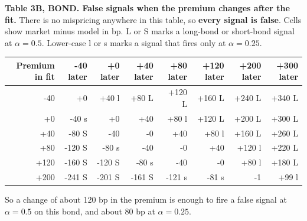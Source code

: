 \documentclass[10pt,a4paper]{article}
\begin{document}
\textbf{Table 3B, BOND. False signals when the premium changes after the fit.} There is no mispricing anywhere in this table, so \textbf{every signal is false}. Cells show market minus model in bp. L or S marks a long-bond or short-bond signal at $\alpha=0.5$. Lower-case l or s marks a signal that fires only at $\alpha=0.25$.
{\small
\begin{center}\begin{tabular}{rrrrrrrr}\toprule
Premium in fit & -40 later & +0 later & +40 later & +80 later & +120 later & +200 later & +300 later \\ \midrule
-40 & +0 & +40 l & +80 L & +120 L & +160 L & +240 L & +340 L \\
+0 & -40 s & +0 & +40 & +80 l & +120 L & +200 L & +300 L \\
+40 & -80 S & -40 & -0 & +40 & +80 l & +160 L & +260 L \\
+80 & -120 S & -80 s & -40 & -0 & +40 & +120 l & +220 L \\
+120 & -160 S & -120 S & -80 s & -40 & -0 & +80 l & +180 L \\
+200 & -241 S & -201 S & -161 S & -121 s & -81 s & -1 & +99 l \\
\bottomrule\end{tabular}\end{center}}

So a change of about 120 bp in the premium is enough to fire a false signal at $\alpha=0.5$ on this bond, and about 80 bp at $\alpha=0.25$.
\end{document}
